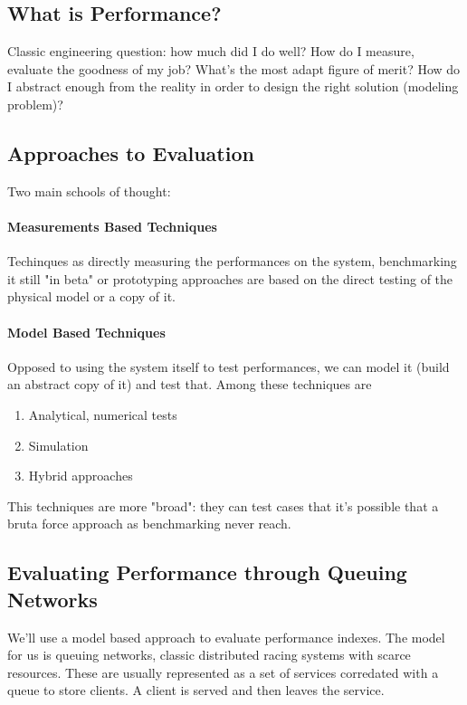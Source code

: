 \documentclass{article}
\begin{document}
			\subsection{What is Performance?}
				Classic engineering question: how much did I do well? How do I measure, evaluate the goodness of my job? What's the most adapt figure of merit? How do I abstract enough from the reality in order to design the right solution (modeling problem)?
				
			\subsection{Approaches to Evaluation}
				Two main schools of thought:
				
				\paragraph{Measurements Based Techniques}
					Techinques as directly measuring the performances on the system, benchmarking it still "in beta" or prototyping approaches are based on the direct testing of the physical model or a copy of it.
					
				\paragraph{Model Based Techniques}
					Opposed to using the system itself to test performances, we can model it (build an abstract copy of it) and test that. Among these techniques are
					\begin{enumerate}
						\item Analytical, numerical tests
						\item Simulation
						\item Hybrid approaches
					\end{enumerate}
					This techniques are more "broad": they can test cases that it's possible that a bruta force approach as benchmarking never reach. 
					
			\subsection{Evaluating Performance through Queuing Networks}
				We'll use a model based approach to evaluate performance indexes. The model for us is queuing networks, classic distributed racing systems with scarce resources. These are usually represented as a set of services corredated with a queue to store clients. A client is served and then leaves the service. 
				
\end{document}
